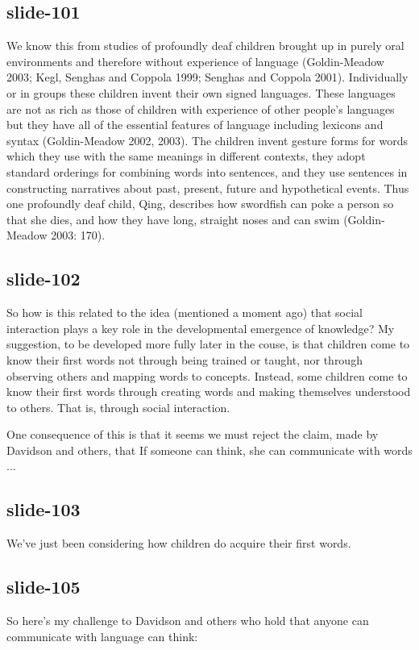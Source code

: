 \documentclass[12pt,\papersize]{extarticle}
\begin{document}
\subsection{slide-101}
We know this from studies of profoundly deaf children brought up in purely oral
environments and therefore without experience of language (Goldin-Meadow 2003; Kegl,
Senghas and Coppola 1999; Senghas and Coppola 2001).
Individually or in groups these children invent their own signed languages.
These languages are not as rich as those of children with experience of other people's
languages but they have all of the essential features of language including lexicons and
syntax (Goldin-Meadow 2002, 2003).
The children invent gesture forms for words which they use with the same meanings in
different contexts, they adopt standard orderings for combining words into sentences,
and they use sentences in constructing narratives about past, present, future and
hypothetical events. Thus one profoundly deaf child, Qing, describes how swordfish can
poke a person so that she dies, and how they have long, straight noses and can swim
(Goldin-Meadow 2003: 170).

\subsection{slide-102}
So how is this related to the idea (mentioned a moment ago)
that social interaction plays a key role in the developmental emergence of knowledge?
My suggestion, to be developed more fully later in the couse,
is that children come to know their first words not through
being trained or taught, nor through observing others and mapping words to concepts.
Instead, some children come to know their first words through
creating words and making themselves understood to others.
That is, through social interaction.

One consequence of this is that it seems we must reject the
claim, made by Davidson and others, that
If someone can think, she can communicate with words ...

\subsection{slide-103}
We’ve just been considering how children do acquire their first words.

\subsection{slide-105}
So here's my challenge to Davidson and others who hold that anyone can communicate with language can think:
\end{document}
